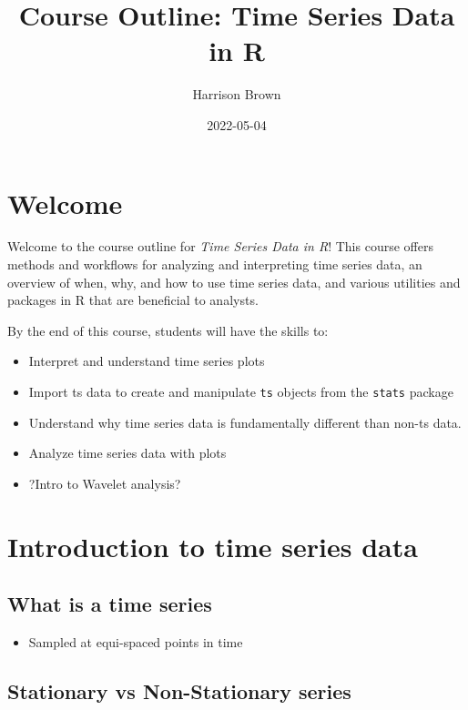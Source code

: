\documentclass[
]{book}
\title{Course Outline: Time Series Data in R}
\author{Harrison Brown}
\date{2022-05-04}
\providecommand{\tightlist}{%
  \setlength{\itemsep}{0pt}\setlength{\parskip}{0pt}}
\begin{document}
\maketitle

{
\setcounter{tocdepth}{1}
\tableofcontents
}
\hypertarget{welcome}{%
\chapter*{Welcome}\label{welcome}}

Welcome to the course outline for \emph{Time Series Data in R}! This course offers methods and workflows for analyzing and interpreting time series data, an overview of when, why, and how to use time series data, and various utilities and packages in R that are beneficial to analysts.

By the end of this course, students will have the skills to:

\begin{itemize}
\tightlist
\item
  Interpret and understand time series plots
\item
  Import ts data to create and manipulate \texttt{ts} objects from the \texttt{stats} package
\item
  Understand why time series data is fundamentally different than non-ts data.
\item
  Analyze time series data with plots
\item
  ?Intro to Wavelet analysis?
\end{itemize}

\hypertarget{introduction-to-time-series-data}{%
\chapter{Introduction to time series data}\label{introduction-to-time-series-data}}

\hypertarget{what-is-a-time-series}{%
\section{What is a time series}\label{what-is-a-time-series}}

\begin{itemize}
\tightlist
\item
  Sampled at equi-spaced points in time
\end{itemize}

\hypertarget{stationary-vs-non-stationary-series}{%
\section{Stationary vs Non-Stationary series}\label{stationary-vs-non-stationary-series}}
\end{document}
